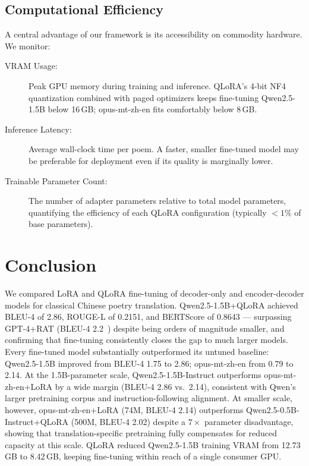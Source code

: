 \subsection{Computational Efficiency}
A central advantage of our framework is its accessibility on commodity
hardware. We monitor:
\begin{description}
    \item[VRAM Usage:] Peak GPU memory during training and inference.
    QLoRA's 4-bit NF4 quantization combined with paged optimizers keeps fine-tuning Qwen2.5-1.5B below 16\,GB; opus-mt-zh-en fits comfortably below 8\,GB.
    \item[Inference Latency:] Average wall-clock time per poem. A faster,
    smaller fine-tuned model may be preferable for deployment even if its
    quality is marginally lower.
    \item[Trainable Parameter Count:] The number of adapter parameters
    relative to total model parameters, quantifying the efficiency of each
    QLoRA configuration (typically $<1\%$ of base parameters).
\end{description}

\section{Conclusion}
We compared LoRA and QLoRA fine-tuning of decoder-only and encoder-decoder models for classical Chinese poetry translation. Qwen2.5-1.5B+QLoRA achieved BLEU-4 of 2.86, ROUGE-L of 0.2151, and BERTScore of 0.8643 --- surpassing GPT-4+RAT (BLEU-4 2.2~\cite{chen2025benchmarking}) despite being orders of magnitude smaller, and confirming that fine-tuning consistently closes the gap to much larger models. Every fine-tuned model substantially outperformed its untuned baseline: Qwen2.5-1.5B improved from BLEU-4 1.75 to 2.86; opus-mt-zh-en from 0.79 to 2.14. At the 1.5B-parameter scale, Qwen2.5-1.5B-Instruct outperforms opus-mt-zh-en+LoRA by a wide margin (BLEU-4 2.86 vs.\ 2.14), consistent with Qwen's larger pretraining corpus and instruction-following alignment. At smaller scale, however, opus-mt-zh-en+LoRA (74M, BLEU-4 2.14) outperforms Qwen2.5-0.5B-Instruct+QLoRA (500M, BLEU-4 2.02) despite a $7\times$ parameter disadvantage, showing that translation-specific pretraining fully compensates for reduced capacity at this scale. QLoRA reduced Qwen2.5-1.5B training VRAM from 12.73\,GB to 8.42\,GB, keeping fine-tuning within reach of a single consumer GPU.

